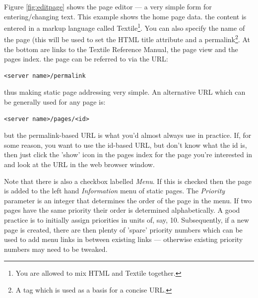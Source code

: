 \documentclass[12pt]{article}
\begin{document}
Figure \ref{fig:editpage} shows the page editor --- a very simple form
for entering/changing text. This example shows the home page data. 
the content is entered in a markup language called Textile\footnote{You are 
allowed to mix HTML and Textile together.}. You can also specify the name
of the page (this will be used to set the HTML title attribute and a
permalink\footnote{A tag which is used as a basis for a concise URL.}.
At the bottom are links to the Textile Reference Manual, the page view
and the pages index. the page can be referred to via the URL:
\begin{verbatim}
<server name>/permalink
\end{verbatim}
thus making static page addressing very simple.
An alternative URL which can be generally used for any page is:
\begin{verbatim}
<server name>/pages/<id>
\end{verbatim}
but the permalink-based URL is what you'd almost always use in practice.
If, for some reason, you want to use the id-based URL, but don't know
what the id is, then just click the 'show' icon in the pages index for
the page you're interested in and look at the URL in the web browser window.

Note that there is also a checkbox labelled \emph{Menu}. If this is
checked then the page is added to the left hand \emph{Information} menu
of static pages. The \emph{Priority} parameter is an integer that
determines the order of the page in the menu. If two pages have the same
priority their order is determined alphabetically.
A good practice is to initially assign priorities in units of, say, 10.
Subsequently, if a new page is created, there are then plenty of 'spare'
priority numbers which can be used to add menu links in between
existing links --- otherwise existing priority numbers may need to be tweaked.
\end{document}
